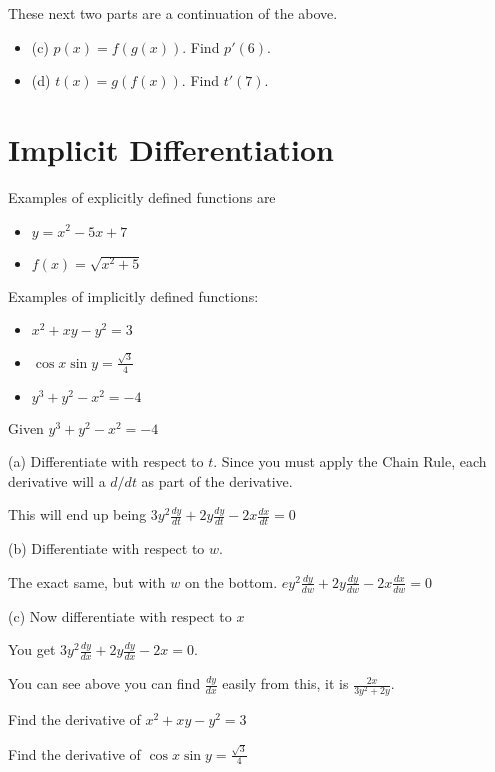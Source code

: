 \documentclass[../bccalc.tex]{subfiles}
\begin{document}
\ex These next two parts are a continuation of the above.
\begin{itemize}
    \item (c) $p(x)=f(g(x))$. Find $p'(6)$.
    \item (d) $t(x)=g(f(x))$. Find $t'(7)$.
\end{itemize}

\pagebreak
\section{Implicit Differentiation}
Examples of explicitly defined functions are 
\begin{itemize}
    \item $y=x^2-5x+7$
    \item $f(x)=\sqrt{x^2+5}$
\end{itemize}

Examples of implicitly defined functions:
\begin{itemize}
    \item $x^2+xy-y^2=3$
    \item $\cos x\sin y=\frac{\sqrt{3}}{4}$
    \item $y^3+y^2-x^2=-4$
\end{itemize}

\begin{example}
    Given $y^3+y^2-x^2=-4$

    (a) Differentiate with respect to $t$. Since you must apply the Chain Rule, each derivative will a $d/dt$ as part of the derivative.

    This will end up being $3y^2\frac{dy}{dt}+2y\frac{dy}{dt}-2x\frac{dx}{dt}=0$

    (b) Differentiate with respect to $w$.

    The exact same, but with $w$ on the bottom. $ey^2\frac{dy}{dw}+2y\frac{dy}{dw}-2x\frac{dx}{dw}=0$

    (c) Now differentiate with respect to $x$

    You get $3y^2\frac{dy}{dx}+2y\frac{dy}{dx}-2x=0$.
\end{example}

You can see above you can find $\frac{dy}{dx}$ easily from this, it is $\frac{2x}{3y^2+2y}$.

\ex Find the derivative of $x^2+xy-y^2=3$

\ex Find the derivative of $\cos x\sin y=\frac{\sqrt{3}}{4}$
\end{document}
